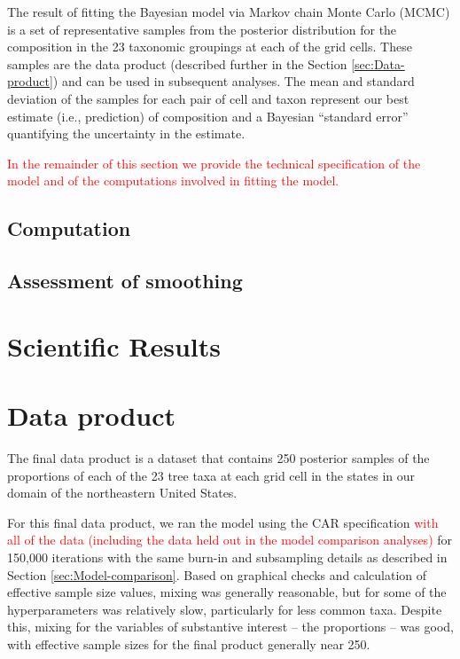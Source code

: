 \documentclass[12pt]{article}\usepackage[]{graphicx}\usepackage[]{color}
\begin{document}
The result of fitting the Bayesian model via Markov chain Monte Carlo
(MCMC) is a set of representative samples from the posterior distribution
for the composition in the 23 taxonomic groupings at each of the grid
cells. These samples are the data product (described further in the
Section \ref{sec:Data-product}) and can be used in subsequent analyses.
The mean and standard deviation of the samples for each pair of cell
and taxon represent our best estimate (i.e., prediction) of composition
and a Bayesian ``standard error'' quantifying the uncertainty in
the estimate. 

\textcolor{red}{In the remainder of this section we provide the technical
specification of the model and of the computations involved in fitting
the model.}


\subsection{Computation}


\subsection{Assessment of smoothing}




\section{Scientific Results}


\section{Data product\label{sec:Data-product}}

The final data product is a dataset that contains 250 posterior samples
of the proportions of each of the 23 tree taxa at each grid cell in
the states in our domain of the northeastern United States.

For this final data product, we ran the model using the CAR specification
\textcolor{red}{with all of the data (including the data held out
in the model comparison analyses)} for 150,000 iterations with the
same burn-in and subsampling details as described in Section \ref{sec:Model-comparison}.
Based on graphical checks and calculation of effective sample size
values, mixing was generally reasonable, but for some of the hyperparameters
was relatively slow, particularly for less common taxa. Despite this,
mixing for the variables of substantive interest -- the proportions
-- was good, with effective sample sizes for the final product generally
near 250.
\end{document}
